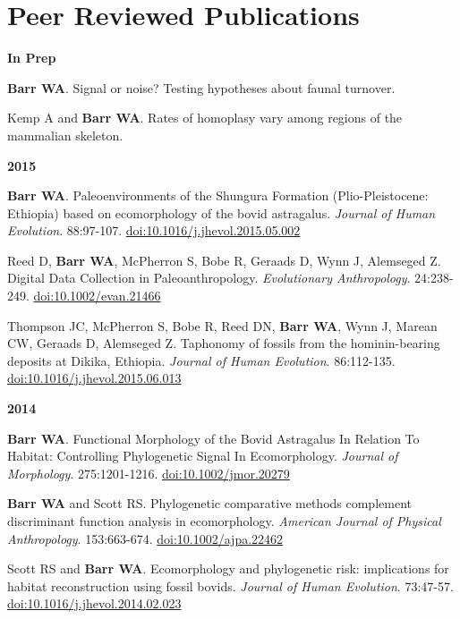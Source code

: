 \documentclass{article}
\begin{document}
\section*{Peer Reviewed Publications}

\begin{description*}
\item[] {\bfseries In Prep}
\item[] {\bfseries Barr WA}. Signal or noise? Testing hypotheses about faunal turnover.
\item[] Kemp A and {\bfseries Barr WA}. Rates of homoplasy vary among regions of the mammalian skeleton.
\end{description*}


\begin{description*}
\item[] {\bfseries 2015}
\item[] {\bfseries Barr WA}. Paleoenvironments of the Shungura Formation (Plio-Pleistocene: Ethiopia) based on ecomorphology of the bovid astragalus. \emph{Journal of Human Evolution}. 88:97-107. \href{http://dx.doi.org/10.1016/j.jhevol.2015.05.002}{doi:10.1016/j.jhevol.2015.05.002}
\item Reed D, {\bfseries Barr WA}, McPherron S, Bobe R, Geraads D, Wynn J, Alemseged Z. Digital Data Collection in Paleoanthropology. \emph{Evolutionary Anthropology}. 24:238-249. \href{http://dx.doi.org/10.1002/evan.21466}{doi:10.1002/evan.21466}
\item[] Thompson JC, McPherron S, Bobe R, Reed DN, {\bfseries Barr WA}, Wynn J, Marean CW, Geraads D, Alemseged Z. Taphonomy of fossils from the hominin-bearing deposits at Dikika, Ethiopia. \emph{Journal of Human Evolution}. 86:112-135. \href{http://dx.doi.org/10.1016/j.jhevol.2015.06.013}{doi:10.1016/j.jhevol.2015.06.013}


\end{description*}

\begin{description*}
\item[] {\bfseries 2014}
\item[] {\bfseries Barr WA}. Functional Morphology of the Bovid Astragalus In Relation To Habitat: Controlling Phylogenetic Signal In Ecomorphology. \emph{Journal
of Morphology}. 275:1201-1216. \href{http://dx.doi.org/10.1002/jmor.20279}{doi:10.1002/jmor.20279}

\item[] {\bfseries Barr WA} and Scott RS. Phylogenetic comparative methods complement discriminant function analysis in ecomorphology. \emph{American Journal
of Physical Anthropology}. 153:663-674. \href{http://dx.doi.org/10.1002/ajpa.22462}{doi:10.1002/ajpa.22462}

\item[] Scott RS and {\bfseries Barr WA}. Ecomorphology and phylogenetic risk: implications for habitat reconstruction using fossil bovids.
\emph{Journal of Human Evolution}. 73:47-57. \href{http://dx.doi.org/10.1016/j.jhevol.2014.02.023}{doi:10.1016/j.jhevol.2014.02.023}

\end{description*}
\end{document}

